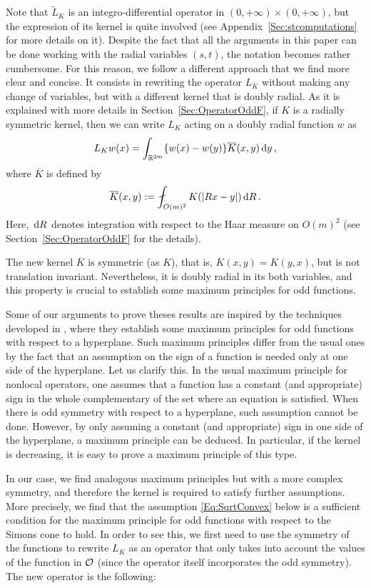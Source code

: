 Note that $\widetilde{L}_K$ is an integro-differential operator in $(0,+\infty)\times(0,+\infty)$, but the expression of its kernel is quite involved (see Appendix~\ref{Sec:stcomputations} for more details on it). Despite the fact that all the arguments in this paper can be done working with the radial variables  $(s,t)$, the notation becomes rather cumbersome. For this reason, we follow a different approach that we find more clear and concise. It consists in rewriting the operator $L_K$ without making any change of variables, but with a different kernel that is doubly radial. As it is explained with more details in Section~\ref{Sec:OperatorOddF}, if $K$ is a radially symmetric kernel, then we can write $L_K$ acting on a doubly radial function $w$ as
$$
L_K w(x) = \int_{\mathbb{R}^{2m}} \{w(x) - w(y)\} \overline{K}(x,y) \,\mathrm{d} y\,,
$$
where $\overline{K}$ is defined by
\begin{equation*}
\overline{K}(x,y) := \average_{O(m)^2} K(|Rx - y|)\d R\,.
\end{equation*}
Here, $\,\mathrm{d} R$ denotes integration with respect to the Haar measure on $O(m)^2$ (see Section~\ref{Sec:OperatorOddF} for the details).

The new kernel $\overline{K}$ is symmetric (as $K$), that is, $\overline{K}(x,y) = \overline{K}(y,x)$, but is not translation invariant. Nevertheless, it is doubly radial in its both variables, and this property is crucial to establish some maximum principles for odd functions.

Some of our arguments to prove theses results are inspired by the techniques developed in \cite{ChenLiLi, JarohsWeth}, where they establish some maximum principles for odd functions with respect to a hyperplane. Such maximum principles differ from the usual ones by the fact that an assumption on the sign of a function is needed only at one side of the hyperplane. Let us clarify this. In the usual maximum principle for nonlocal operators, one assumes that a function has a constant (and appropriate) sign in the whole complementary of the set where an equation is satisfied. When there is odd symmetry with respect to a hyperplane, such assumption cannot be done. However, by only assuming a constant (and appropriate) sign in one side of the hyperplane, a maximum principle can be deduced. In particular, if the kernel is decreasing, it is easy to prove a maximum principle of this type. 

In our case, we find analogous maximum principles but with a more complex symmetry, and therefore the kernel is required to satisfy further assumptions. More precisely, we find that the assumption \eqref{Eq:SqrtConvex} below is a sufficient condition for the maximum principle for odd functions with respect to the Simons cone to hold. In order to see this, we  first need to use the symmetry of the functions to rewrite $L_K$ as an operator that only takes into account the values of the function in $\mathcal{O}$ (since the operator itself incorporates the odd symmetry). The new operator is the following:

